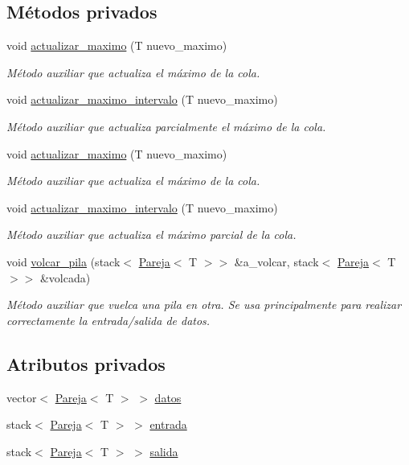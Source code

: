 \subsection*{Métodos privados}
\begin{DoxyCompactItemize}
\item 
void \hyperlink{classCola__max_a3da0159f810815fbbd7f3ba895f65e62}{actualizar\+\_\+maximo} (T nuevo\+\_\+maximo)
\begin{DoxyCompactList}\small\item\em Método auxiliar que actualiza el máximo de la cola. \end{DoxyCompactList}\item 
void \hyperlink{classCola__max_a514a99c8c65ea41f9f28d56a9db1c6c6}{actualizar\+\_\+maximo\+\_\+intervalo} (T nuevo\+\_\+maximo)
\begin{DoxyCompactList}\small\item\em Método auxiliar que actualiza parcialmente el máximo de la cola. \end{DoxyCompactList}\item 
void \hyperlink{classCola__max_a3da0159f810815fbbd7f3ba895f65e62}{actualizar\+\_\+maximo} (T nuevo\+\_\+maximo)
\begin{DoxyCompactList}\small\item\em Método auxiliar que actualiza el máximo de la cola. \end{DoxyCompactList}\item 
void \hyperlink{classCola__max_a514a99c8c65ea41f9f28d56a9db1c6c6}{actualizar\+\_\+maximo\+\_\+intervalo} (T nuevo\+\_\+maximo)
\begin{DoxyCompactList}\small\item\em Método auxiliar que actualiza el máximo parcial de la cola. \end{DoxyCompactList}\item 
void \hyperlink{classCola__max_af3e9275233822fa1d64149b10262dff3}{volcar\+\_\+pila} (stack$<$ \hyperlink{structPareja}{Pareja}$<$ T $>$$>$ \&a\+\_\+volcar, stack$<$ \hyperlink{structPareja}{Pareja}$<$ T $>$$>$ \&volcada)
\begin{DoxyCompactList}\small\item\em Método auxiliar que vuelca una pila en otra. Se usa principalmente para realizar correctamente la entrada/salida de datos. \end{DoxyCompactList}\end{DoxyCompactItemize}
\subsection*{Atributos privados}
\begin{DoxyCompactItemize}
\item 
vector$<$ \hyperlink{structPareja}{Pareja}$<$ T $>$ $>$ \hyperlink{classCola__max_ada37415a95bf9e23e54aa10b478270cf}{datos}
\item 
stack$<$ \hyperlink{structPareja}{Pareja}$<$ T $>$ $>$ \hyperlink{classCola__max_a6bf7cfc0872c68657dbc7fabb4fa2fc5}{entrada}
\item 
stack$<$ \hyperlink{structPareja}{Pareja}$<$ T $>$ $>$ \hyperlink{classCola__max_ac59781b55ff4f65d8a87b06e2d498fa5}{salida}
\end{DoxyCompactItemize}


